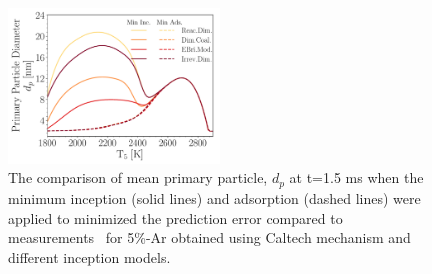 \begin{figure}[H]
	\centering
	\includegraphics[width=0.5\textwidth]{Figures/Results/Shocktube/Agafonov2016_cpr/d_p_maxincads_combined.pdf}
	\caption{The comparison of mean primary particle, $d_p$ at t=1.5 ms when the minimum inception (solid lines) and adsorption (dashed lines) were applied to minimized the prediction error compared to measurements~\citep{agafonov2016unified} for 5\%-Ar obtained using Caltech mechanism and different inception models.}
	\label{fig:shockagof_dp_maxincads_cpr} 
\end{figure}





